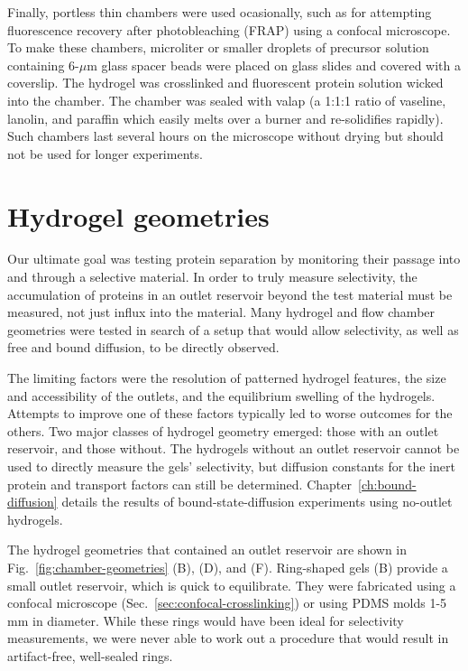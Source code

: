 Finally, portless thin chambers were used ocasionally, such as for attempting fluorescence recovery after photobleaching (FRAP) using a confocal microscope.  To make these chambers, microliter or smaller droplets of precursor solution containing 6-$\mu$m glass spacer beads were placed on glass slides and covered with a coverslip.  The hydrogel was crosslinked and fluorescent protein solution wicked into the chamber.  The chamber was sealed with valap (a 1:1:1 ratio of vaseline, lanolin, and paraffin which easily melts over a burner and re-solidifies rapidly).  Such chambers last several hours on the microscope without drying but should not be used for longer experiments.

\section{Hydrogel geometries}
\label{sec:gel-geometries}

Our ultimate goal was testing protein separation by monitoring their passage into and through a selective material.  In order to truly measure selectivity, the accumulation of proteins in an outlet reservoir beyond the test material must be measured, not just influx into the material.  Many hydrogel and flow chamber geometries were tested in search of a setup that would allow selectivity, as well as free and bound diffusion, to be directly observed.

The limiting factors were the resolution of patterned hydrogel features, the size and accessibility of the outlets, and the equilibrium swelling of the hydrogels.  Attempts to improve one of these factors typically led to worse outcomes for the others.  Two major classes of hydrogel geometry emerged: those with an outlet reservoir, and those without.  The hydrogels without an outlet reservoir cannot be used to directly measure the gels' selectivity, but diffusion constants for the inert protein and transport factors can still be determined.  Chapter~\ref{ch:bound-diffusion} details the results of bound-state-diffusion experiments using no-outlet hydrogels.

The hydrogel geometries that contained an outlet reservoir are shown in Fig.~\ref{fig:chamber-geometries} (B), (D), and (F).  Ring-shaped gels (B) provide a small outlet reservoir, which is quick to equilibrate.  They were fabricated using a confocal microscope (Sec.~\ref{sec:confocal-crosslinking}) or using PDMS molds 1-5 mm in diameter.  While these rings would have been ideal for selectivity measurements, we were never able to work out a procedure that would result in artifact-free, well-sealed rings.

